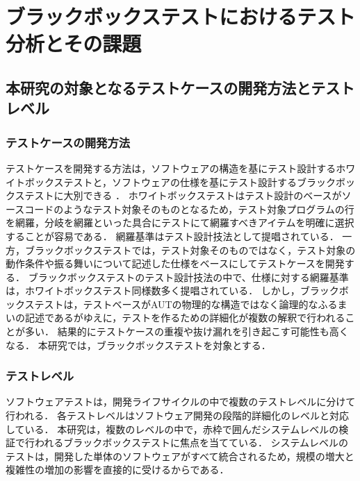 \documentclass[a4paper,12pt]{jreport}
\begin{document}
\chapter{ブラックボックステストにおけるテスト分析とその課題}
\section{本研究の対象となるテストケースの開発方法とテストレベル}
\subsection{テストケースの開発方法}
テストケースを開発する方法は，ソフトウェアの構造を基にテスト設計するホワイトボックステストと，ソフトウェアの仕様を基にテスト設計するブラックボックステストに大別できる\cite{myers2011art} ．
ホワイトボックステストはテスト設計のベースがソースコードのようなテスト対象そのものとなるため，テスト対象プログラムの行を網羅，分岐を網羅といった具合にテストにて網羅すべきアイテムを明確に選択することが容易である．
網羅基準はテスト設計技法として提唱されている\cite{myers2011art}．
一方，ブラックボックステストでは，テスト対象そのものではなく，テスト対象の動作条件や振る舞いについて記述した仕様をベースにしてテストケースを開発する．
ブラックボックステストのテスト設計技法の中で、仕様に対する網羅基準は，ホワイトボックステスト同様数多く提唱されている\cite{myers2011art}．
しかし，ブラックボックステストは，テストベースがAUTの物理的な構造ではなく論理的なふるまいの記述であるがゆえに，テストを作るための詳細化が複数の解釈で行われることが多い\cite{yumoto2013test}．
結果的にテストケースの重複や抜け漏れを引き起こす可能性も高くなる．
本研究では，ブラックボックステストを対象とする．
\subsection{テストレベル}
ソフトウェアテストは，開発ライフサイクルの中で複数のテストレベルに分けて行われる．
各テストレベルはソフトウェア開発の段階的詳細化のレベルと対応している．
本研究は，複数のレベルの中で，赤枠で囲んだシステムレベルの検証で行われるブラックボックステストに焦点を当てている．
システムレベルのテストは，開発した単体のソフトウェアがすべて統合されるため，規模の増大と複雑性の増加の影響を直接的に受けるからである．
\end{document}
